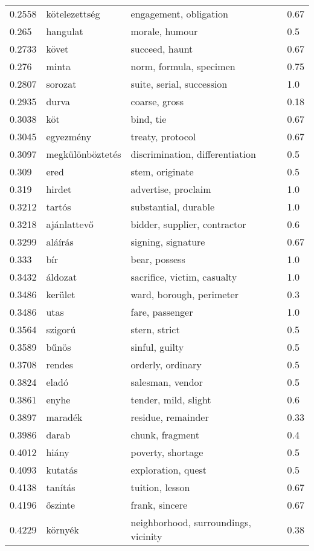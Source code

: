 \documentclass[11pt]{article}
\begin{document}
\begin{table*}
\begin{tabular}{llll}
0.2558	& kötelezettség	& engagement, obligation	& 0.67 \\
0.265	& hangulat	& morale, humour	& 0.5 \\
0.2733	& követ	& succeed, haunt	& 0.67 \\
0.276	& minta	& norm, formula, specimen	& 0.75 \\
0.2807	& sorozat	& suite, serial, succession	& 1.0 \\
0.2935	& durva	& coarse, gross	& 0.18 \\
0.3038	& köt	& bind, tie	& 0.67 \\
0.3045	& egyezmény	& treaty, protocol	& 0.67 \\
0.3097	& megkülönböztetés	& discrimination, differentiation	& 0.5 \\
0.309	& ered	& stem, originate	& 0.5 \\
0.319	& hirdet	& advertise, proclaim	& 1.0 \\
0.3212	& tartós	& substantial, durable	& 1.0 \\
0.3218	& ajánlattevő	& bidder, supplier, contractor	& 0.6 \\
0.3299	& aláírás	& signing, signature	& 0.67 \\
0.333	& bír	& bear, possess	& 1.0 \\
0.3432	& áldozat	& sacrifice, victim, casualty	& 1.0 \\
0.3486	& kerület	& ward, borough, perimeter	& 0.3 \\
0.3486	& utas	& fare, passenger	& 1.0 \\
0.3564	& szigorú	& stern, strict	& 0.5 \\
0.3589	& bűnös	& sinful, guilty	& 0.5 \\
0.3708	& rendes	& orderly, ordinary	& 0.5 \\
0.3824	& eladó	& salesman, vendor	& 0.5 \\
0.3861	& enyhe	& tender, mild, slight	& 0.6 \\
0.3897	& maradék	& residue, remainder	& 0.33 \\
0.3986	& darab	& chunk, fragment	& 0.4 \\
0.4012	& hiány	& poverty, shortage	& 0.5 \\
0.4093	& kutatás	& exploration, quest	& 0.5 \\
0.4138	& tanítás	& tuition, lesson	& 0.67 \\
0.4196	& őszinte	& frank, sincere	& 0.67 \\
0.4229	& környék	& neighborhood, surroundings, vicinity	& 0.38 \\

\end{tabular}
\end{table*}
\end{document}
